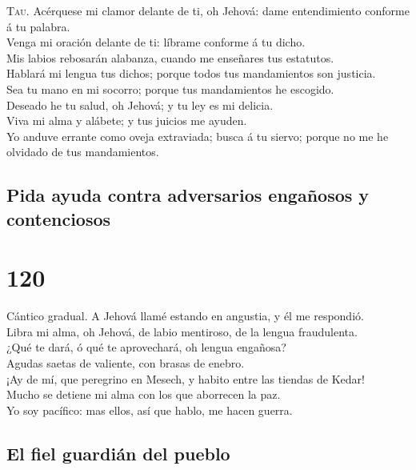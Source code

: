  \textsc{Tau}. Acérquese mi clamor delante de ti, oh
Jehová: dame entendimiento conforme á tu palabra.\\
 Venga mi oración delante de ti: líbrame conforme á tu
dicho.\\
 Mis labios rebosarán alabanza, cuando me enseñares tus
estatutos.\\
 Hablará mi lengua tus dichos; porque todos tus
mandamientos son justicia.\\
 Sea tu mano en mi socorro; porque tus mandamientos he
escogido.\\
 Deseado he tu salud, oh Jehová; y tu ley es mi
delicia.\\
 Viva mi alma y alábete; y tus juicios me ayuden.\\
 Yo anduve errante como oveja extraviada; busca á tu
siervo; porque no me he olvidado de tus mandamientos.

\hypertarget{pida-ayuda-contra-adversarios-engauxf1osos-y-contenciosos}{%
\subsection{Pida ayuda contra adversarios engañosos y
contenciosos}\label{pida-ayuda-contra-adversarios-engauxf1osos-y-contenciosos}}

\hypertarget{section-19-120}{%
\section{120}\label{section-19-120}}

 Cántico gradual. A Jehová llamé estando en angustia, y él
me respondió.\\
 Libra mi alma, oh Jehová, de labio mentiroso, de la
lengua fraudulenta.\\
 ¿Qué te dará, ó qué te aprovechará, oh lengua engañosa?\\
 Agudas saetas de valiente, con brasas de enebro.\\
 ¡Ay de mí, que peregrino en Mesech, y habito entre las
tiendas de Kedar!\\
 Mucho se detiene mi alma con los que aborrecen la paz.\\
 Yo soy pacífico: mas ellos, así que hablo, me hacen
guerra.

\hypertarget{el-fiel-guardiuxe1n-del-pueblo}{%
\subsection{El fiel guardián del
pueblo}\label{el-fiel-guardiuxe1n-del-pueblo}}

